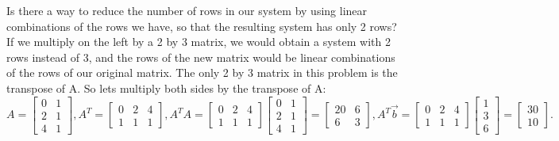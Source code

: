 \documentclass[10pt]{article}
\begin{document}
Is there a way to reduce the number of rows in our system by using linear combinations of the rows we have, so that the resulting system has only 2 rows? If we multiply on the left by a 2 by 3 matrix, we would obtain a system with 2 rows instead of 3, and the rows of the new matrix would be linear combinations of the rows of our original matrix.  The only 2 by 3 matrix in this problem is the transpose of A.  So lets multiply both sides by the transpose of A:
$$A = \begin{bmatrix}0&1\\2&1\\4&1\end{bmatrix}, 
A^T = \begin{bmatrix}0&2&4\\1&1&1\end{bmatrix}, 
A^T A =\begin{bmatrix}0&2&4\\1&1&1\end{bmatrix}\begin{bmatrix}0&1\\2&1\\4&1\end{bmatrix}= \begin{bmatrix}20&6\\6&3\end{bmatrix}, 
A^T\vec b =  \begin{bmatrix}0&2&4\\1&1&1\end{bmatrix}\begin{bmatrix}1\\3\\6\end{bmatrix} = \begin{bmatrix}30\\10\end{bmatrix}.
$$
\end{document}
